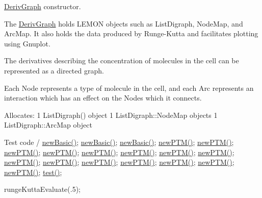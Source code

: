 \hyperlink{classDerivGraph}{DerivGraph} constructor.

The \hyperlink{classDerivGraph}{DerivGraph} holds LEMON objects such as ListDigraph, NodeMap, and ArcMap. It also holds the data produced by Runge-\/Kutta and facilitates plotting using Gnuplot.

The derivatives describing the concentration of molecules in the cell can be represented as a directed graph.

Each Node represents a type of molecule in the cell, and each Arc represents an interaction which has an effect on the Nodes which it connects.

Allocates: 1 ListDigraph() object 1 ListDigraph::NodeMap objects 1 ListDigraph::ArcMap object 

Test code / \hyperlink{classDerivGraph_a8862d4f9ebbd3eced9d56a81fe91c4fb}{newBasic()}; \hyperlink{classDerivGraph_a8862d4f9ebbd3eced9d56a81fe91c4fb}{newBasic()}; \hyperlink{classDerivGraph_a8862d4f9ebbd3eced9d56a81fe91c4fb}{newBasic()}; \hyperlink{classDerivGraph_a83937a5c3ed427ebaad2bf23260c0352}{newPTM()}; \hyperlink{classDerivGraph_a83937a5c3ed427ebaad2bf23260c0352}{newPTM()}; \hyperlink{classDerivGraph_a83937a5c3ed427ebaad2bf23260c0352}{newPTM()}; \hyperlink{classDerivGraph_a83937a5c3ed427ebaad2bf23260c0352}{newPTM()}; \hyperlink{classDerivGraph_a83937a5c3ed427ebaad2bf23260c0352}{newPTM()}; \hyperlink{classDerivGraph_a83937a5c3ed427ebaad2bf23260c0352}{newPTM()}; \hyperlink{classDerivGraph_a83937a5c3ed427ebaad2bf23260c0352}{newPTM()}; \hyperlink{classDerivGraph_a83937a5c3ed427ebaad2bf23260c0352}{newPTM()}; \hyperlink{classDerivGraph_a83937a5c3ed427ebaad2bf23260c0352}{newPTM()}; \hyperlink{classDerivGraph_a83937a5c3ed427ebaad2bf23260c0352}{newPTM()}; \hyperlink{classDerivGraph_a83937a5c3ed427ebaad2bf23260c0352}{newPTM()}; \hyperlink{classDerivGraph_a83937a5c3ed427ebaad2bf23260c0352}{newPTM()}; \hyperlink{classDerivGraph_a83937a5c3ed427ebaad2bf23260c0352}{newPTM()}; \hyperlink{classDerivGraph_a83937a5c3ed427ebaad2bf23260c0352}{newPTM()}; \hyperlink{classDerivGraph_a83937a5c3ed427ebaad2bf23260c0352}{newPTM()}; \hyperlink{classDerivGraph_abf589f6aabe2c66bbe6f1aeb68ff4593}{test()};

rungeKuttaEvaluate(.5);

